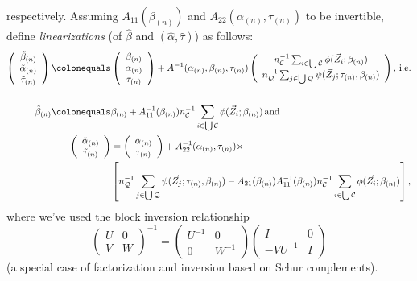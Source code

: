 \documentclass{article}
\newcommand{\defeq}{\ensuremath{\colonequals}}
\begin{document}
respectively. Assuming $A_{11}(\beta_{(n)})$ and $A_{22}(\alpha_{(n)},
\tau_{(n)})$ to be invertible, define \textit{linearizations} (of
$\hat\beta$ and $(\hat\alpha, \hat\tau)$) as follows:
  \begin{align}
    \left(\begin{array}{c}\tilde{\beta}_{(n)}\\\tilde{\alpha}_{(n)}\\ \tilde{\tau}_{(n)} \end{array}\right)
    \defeq& \left(\begin{array}{c}\beta_{(n)} \\\alpha_{(n)}\\
                    \tau_{(n)} \end{array}\right)
    + A^{-1}(\alpha_{(n)}, \beta_{(n)}, \tau_{(n)})\left(
    \begin{array}{c}
      n_{\mathcal{C}}^{-1}\sum_{i\in \bigcup
      \mathcal{C}}\phi(\vec{Z}_{i}; \beta_{(n)})\\
      n_{\mathcal{Q}}^{-1}\sum_{j\in \bigcup
                 \mathcal{Q}}\psi(\vec{Z}_{j};
                 \tau_{(n)},\beta_{(n)} )
    \end{array}
    \right),\, \text{i.e.} \nonumber \\
   \nonumber \\
       \tilde{\beta}_{(n)}
    \defeq& \beta_{(n)} + A_{11}^{-1}(\beta_{(n)})n_{\mathcal{C}}^{-1}\sum_{i\in \bigcup \mathcal{C}}\phi(\vec{Z}_{i}; \beta_{(n)})
  \, \text{and} \nonumber\\
\left(\begin{array}{c}\tilde{\alpha}_{(n)}\\ \tilde{\tau}_{(n)} \end{array}\right)               &=\left(\begin{array}{c}\alpha_{(n)}\\
                         \tau_{(n)} \end{array}\right) +
    A_{22}^{-1}(\alpha_{(n)}, \tau_{(n)})\times \label{eq:20}\\
    & \left[
                 n_{\mathcal{Q}}^{-1}\sum_{j\in \bigcup
                 \mathcal{Q}}\psi(\vec{Z}_{j};
                 \tau_{(n)},\beta_{(n)} ) - A_{21}(\beta_{(n)}) A_{11}^{-1}(\beta_{(n)})n_{\mathcal{C}}^{-1}\sum_{i\in \bigcup \mathcal{C}}\phi(\vec{Z}_{i}; \beta_{(n)})\right],\nonumber
\end{align}
where we've used the block inversion relationship
\begin{equation*}
  \label{eq:23}
  \left(\begin{array}{cc}U & 0 \\ V & W \end{array} \right)^{-1} =
  \left(\begin{array}{cc}U^{-1} & 0 \\ 0 & W^{-1} \end{array} \right)
  \left(\begin{array}{cc} I & 0 \\ -VU^{-1} & I \end{array} \right)
\end{equation*}
(a special case of factorization and inversion based on Schur complements).
\end{document}
